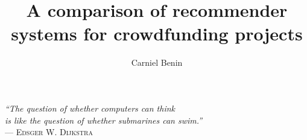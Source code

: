 \documentclass[cic,tc,english]{iiufrgs}
\title{A comparison of recommender systems for crowdfunding projects}
\author{Carniel Benin}{Adriano}
\begin{document}
\maketitle

\clearpage
\begin{flushright}
    \mbox{}\vfill
    {\sffamily\itshape
      ``The question of whether computers can think\\
      is like the question of whether submarines can swim.''\\}
    --- \textsc{Edsger W. Dijkstra}
\end{flushright}






\end{document}
